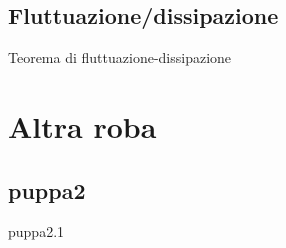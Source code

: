 \documentclass[10pt]{beamer}
\begin{document}
\subsection{Fluttuazione/dissipazione}
\begin{frame}{Teorema di fluttuazione-dissipazione}
 
\end{frame}


\section{Altra roba}
\subsection{puppa2}
\begin{frame}{puppa2.1}
 
\end{frame}
\end{document}

